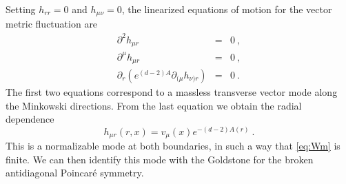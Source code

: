 Setting $h_{rr}=0$ and $h_{\mu\nu}=0$,
the linearized equations of motion for the vector metric fluctuation are
\begin{subequations}
\begin{eqnarray}
     \partial^2 h_{\mu r} &= &0\ ,\\
	\partial^\mu h_{\mu r} &= &0\ ,\\
     \partial_r \left(e^{(d-2)A} \partial_{(\mu} h_{\nu) r}\right) &=&0\ .
\end{eqnarray}
\end{subequations}
The first two equations correspond to a massless transverse vector mode along the Minkowski directions. From the last equation we obtain the radial dependence
\begin{equation}
	h_{\mu r}(r,x)=v_\mu(x) e^{-(d-2) A(r)}\ .
\end{equation}
This is a normalizable mode at both boundaries, in such a way that \eqref{eq:Wm} is finite. We can then identify this mode with the Goldstone for the broken antidiagonal Poincar\'e symmetry.

